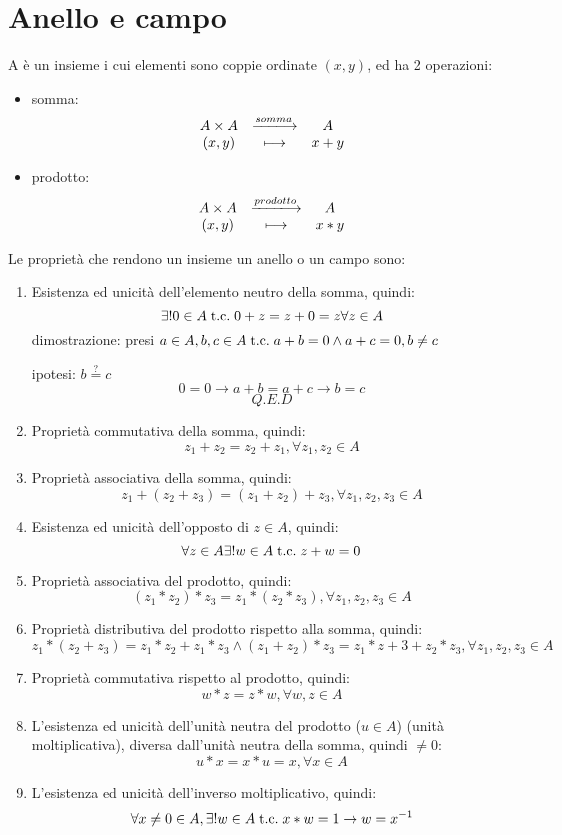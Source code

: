 \documentclass[a4paper,12pt]{article}
\begin{document}
	\section{Anello e campo}
	A è un insieme i cui elementi sono coppie ordinate $(x,y)$, ed ha 2 operazioni:
	\begin{itemize}
		\item somma: 
		\[
		\begin{array}{c c c}
			A \times A & \xlongrightarrow{somma} & A \\
			(x, y) & \longmapsto & x + y \\
		\end{array}
		\]
		\item prodotto:
		\[
		\begin{array}{c c c}
			A \times A & \xlongrightarrow{prodotto} & A \\
			(x, y) & \longmapsto & x * y \\
		\end{array}
		\]		
	\end{itemize}
	Le proprietà che rendono un insieme un anello o un campo sono:
	\begin{enumerate}
		\item Esistenza ed unicità dell'elemento neutro della somma, quindi:
		\[\exists! 0\in A \;\text{t.c.}\; 0 + z = z + 0 = z \forall z\in A\]
		dimostrazione: presi $a \in A, b,c \in A \;\text{t.c.}\; a + b = 0 \wedge a + c = 0, b \not = c$
		
		ipotesi: $b \stackrel{?}{=} c$
		\[0 = 0 \rightarrow a + b = a + c \rightarrow b = c\]
		\[Q.E.D\]
		\item Proprietà commutativa della somma, quindi: 
		\[z_1 + z_2 = z_2 + z_1, \forall z_1,z_2\in A\]
		\item Proprietà associativa della somma, quindi:
		\[z_1 + (z_2+z_3) = (z_1 + z_2) + z_3, \forall z_1,z_2,z_3\in A\]
		\item Esistenza ed unicità dell'opposto di $z \in A$, quindi:
		\[\forall z \in A \exists! w\in A \;\text{t.c.}\; z + w = 0\]
		\item Proprietà associativa del prodotto, quindi:
		\[(z_1 * z_2) * z_3 = z_1 * (z_2 * z_3), \forall z_1,z_2,z_3\in A\]
		\item Proprietà distributiva del prodotto rispetto alla somma, quindi:
		\[z_1 * (z_2 + z_3) = z_1 * z_2 + z_1 * z_3 \wedge (z_1 + z_2) * z_3 = z_1 * z+3 + z_2 * z_3, \forall z_1,z_2,z_3\in A\]
		\item Proprietà commutativa rispetto al prodotto, quindi:
		\[w * z = z * w, \forall w,z \in A\]
		\item L'esistenza ed unicità dell'unità neutra del prodotto ($u \in A$) (unità moltiplicativa), diversa dall'unità neutra della somma, quindi $\not = 0$:
		\[u * x = x * u = x, \forall x \in A\]
		\item L'esistenza ed unicità dell'inverso moltiplicativo, quindi:
		\[\forall x\not = 0 \in A, \exists! w\in A \;\text{t.c.}\; x * w = 1 \rightarrow w = x^{-1}\]
	\end{enumerate}
	
\end{document}
